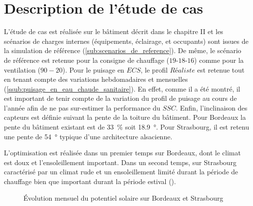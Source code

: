 



\section{Description de l’étude de cas} %
\label{sec:description_de_l_etude_de_cas}
L’étude de cas est réalisée sur le bâtiment décrit dans le chapitre II et les scénarios de
charges internes (équipements, éclairage, et occupants) sont issues de la simulation de
référence (\ref{sub:scenarios_de_reference}). De même, le scénario de référence est
retenue pour la consigne de chauffage ($19$-$18$-$16$) comme pour la ventilation
($90-20$). Pour le puisage en $ECS$, le profil $Réaliste$ est retenue tout en tenant
compte des variations hebdomadaires et mensuelles
(\ref{ssub:puisage_en_eau_chaude_sanitaire}). En effet, comme il a été montré, il est
important de tenir compte de la variation du profil de puisage au cours de l’année afin de
ne pas sur-estimer la performance du $SSC$. Enfin, l’inclinaison des capteurs est définie
suivant la pente de la toiture du bâtiment. Pour Bordeaux la pente du bâtiment existant
est de \SI{33}{\percent} soit \SI{18.9}{\degree}. Pour Strasbourg, il est retenu une pente
de \SI{54}{\degree} typique d’une architecture alsacienne.

L’optimisation est réalisée dans un premier temps sur Bordeaux, dont le climat
est doux et l’ensoleillement important. Dans un second temps, sur Strasbourg caractérisé
par un climat rude et un ensoleillement limité durant la période de chauffage bien que
important durant la période estival ().


\begin{figure}
    \centering
    \caption[Évolution mensuel du potentiel solaire sur Bordeaux et Strasbourg]
            {Évolution mensuel du potentiel solaire sur Bordeaux et Strasbourg}
    \label{fig:diff_ensoleillement_bor_stras}
\end{figure}

